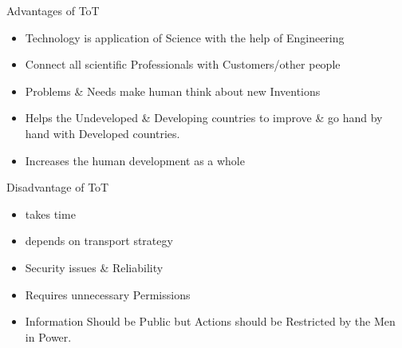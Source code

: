 \begin{frame}{Advantages of ToT}
\begin{itemize}
	\item Technology is application of Science with the help of Engineering
	\item Connect all scientific Professionals with Customers/other people
	\item Problems \& Needs make human think about new Inventions
	\item Helps the Undeveloped \& Developing countries to improve \& go hand by hand with Developed countries.
	\item Increases the human development as a whole
\end{itemize}
\end{frame}

\begin{frame}{Disadvantage of ToT}
\begin{itemize}
	\item takes time
	\item depends on transport strategy
	\item Security issues \& Reliability
	\item Requires unnecessary Permissions
	\item Information Should be Public but Actions should be Restricted by the Men in Power.
\end{itemize}
\end{frame}
